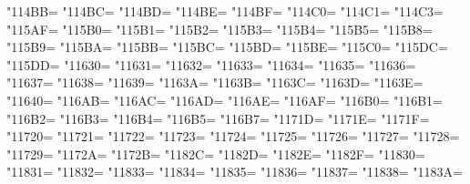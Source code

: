 \XeTeXcharclass"114BB=\KclassCM
\XeTeXcharclass"114BC=\KclassCM
\XeTeXcharclass"114BD=\KclassCM
\XeTeXcharclass"114BE=\KclassCM
\XeTeXcharclass"114BF=\KclassCM
\XeTeXcharclass"114C0=\KclassCM
\XeTeXcharclass"114C1=\KclassCM
\XeTeXcharclass"114C3=\KclassCM
\XeTeXcharclass"115AF=\KclassCM
\XeTeXcharclass"115B0=\KclassCM
\XeTeXcharclass"115B1=\KclassCM
\XeTeXcharclass"115B2=\KclassCM
\XeTeXcharclass"115B3=\KclassCM
\XeTeXcharclass"115B4=\KclassCM
\XeTeXcharclass"115B5=\KclassCM
\XeTeXcharclass"115B8=\KclassCM
\XeTeXcharclass"115B9=\KclassCM
\XeTeXcharclass"115BA=\KclassCM
\XeTeXcharclass"115BB=\KclassCM
\XeTeXcharclass"115BC=\KclassCM
\XeTeXcharclass"115BD=\KclassCM
\XeTeXcharclass"115BE=\KclassCM
\XeTeXcharclass"115C0=\KclassCM
\XeTeXcharclass"115DC=\KclassCM
\XeTeXcharclass"115DD=\KclassCM
\XeTeXcharclass"11630=\KclassCM
\XeTeXcharclass"11631=\KclassCM
\XeTeXcharclass"11632=\KclassCM
\XeTeXcharclass"11633=\KclassCM
\XeTeXcharclass"11634=\KclassCM
\XeTeXcharclass"11635=\KclassCM
\XeTeXcharclass"11636=\KclassCM
\XeTeXcharclass"11637=\KclassCM
\XeTeXcharclass"11638=\KclassCM
\XeTeXcharclass"11639=\KclassCM
\XeTeXcharclass"1163A=\KclassCM
\XeTeXcharclass"1163B=\KclassCM
\XeTeXcharclass"1163C=\KclassCM
\XeTeXcharclass"1163D=\KclassCM
\XeTeXcharclass"1163E=\KclassCM
\XeTeXcharclass"11640=\KclassCM
\XeTeXcharclass"116AB=\KclassCM
\XeTeXcharclass"116AC=\KclassCM
\XeTeXcharclass"116AD=\KclassCM
\XeTeXcharclass"116AE=\KclassCM
\XeTeXcharclass"116AF=\KclassCM
\XeTeXcharclass"116B0=\KclassCM
\XeTeXcharclass"116B1=\KclassCM
\XeTeXcharclass"116B2=\KclassCM
\XeTeXcharclass"116B3=\KclassCM
\XeTeXcharclass"116B4=\KclassCM
\XeTeXcharclass"116B5=\KclassCM
\XeTeXcharclass"116B7=\KclassCM
\XeTeXcharclass"1171D=\KclassCM
\XeTeXcharclass"1171E=\KclassCM
\XeTeXcharclass"1171F=\KclassCM
\XeTeXcharclass"11720=\KclassCM
\XeTeXcharclass"11721=\KclassCM
\XeTeXcharclass"11722=\KclassCM
\XeTeXcharclass"11723=\KclassCM
\XeTeXcharclass"11724=\KclassCM
\XeTeXcharclass"11725=\KclassCM
\XeTeXcharclass"11726=\KclassCM
\XeTeXcharclass"11727=\KclassCM
\XeTeXcharclass"11728=\KclassCM
\XeTeXcharclass"11729=\KclassCM
\XeTeXcharclass"1172A=\KclassCM
\XeTeXcharclass"1172B=\KclassCM
\XeTeXcharclass"1182C=\KclassCM
\XeTeXcharclass"1182D=\KclassCM
\XeTeXcharclass"1182E=\KclassCM
\XeTeXcharclass"1182F=\KclassCM
\XeTeXcharclass"11830=\KclassCM
\XeTeXcharclass"11831=\KclassCM
\XeTeXcharclass"11832=\KclassCM
\XeTeXcharclass"11833=\KclassCM
\XeTeXcharclass"11834=\KclassCM
\XeTeXcharclass"11835=\KclassCM
\XeTeXcharclass"11836=\KclassCM
\XeTeXcharclass"11837=\KclassCM
\XeTeXcharclass"11838=\KclassCM
\XeTeXcharclass"1183A=\KclassCM
